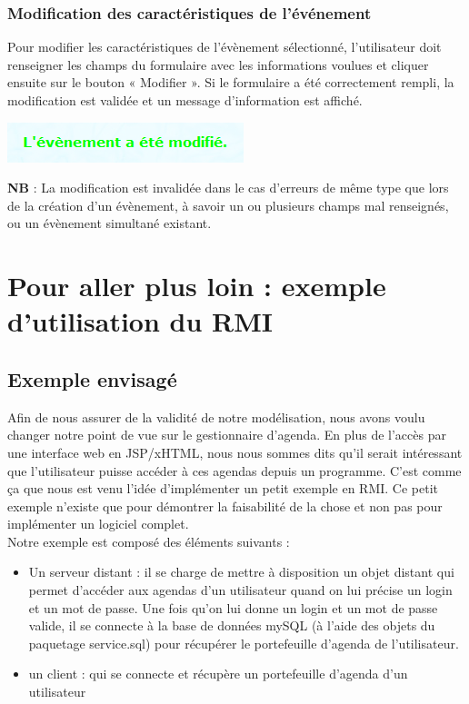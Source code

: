 \documentclass[12pt , a4paper]{article}
\begin{document}
\subsubsection{Modification des caractéristiques de l'événement}
\noindent Pour modifier les caractéristiques de l’évènement sélectionné, l’utilisateur doit renseigner les
champs du formulaire avec les informations voulues et cliquer ensuite sur le bouton
« Modifier ». Si le formulaire a été correctement rempli, la modification est validée et un
message d’information est affiché.
\begin{center}
  \includegraphics[scale=0.6]{./images/modif_event2.png}
\end{center}


\noindent \textbf{NB} : La modification est invalidée dans le cas d’erreurs de même type que lors de la création
d’un évènement, à savoir un ou plusieurs champs mal renseignés, ou un évènement simultané
existant.




\newpage
\section{Pour aller plus loin : exemple d'utilisation du RMI}
\subsection{Exemple envisagé}
\noindent Afin de nous assurer de  la validité de notre modélisation, nous avons voulu changer notre  point de vue sur le gestionnaire d'agenda. En plus de l'accès  par une interface web en JSP/xHTML,
nous nous sommes dits  qu'il serait intéressant que l'utilisateur puisse accéder à  ces agendas depuis un programme. C'est comme ça  que nous est venu l'idée d'implémenter un  petit exemple en RMI. Ce
petit exemple n'existe que pour démontrer la faisabilité de la chose et non pas pour implémenter un logiciel complet.\\
Notre exemple est composé des éléments suivants :
\begin{itemize}
\item Un serveur distant : il se charge de mettre à disposition un objet distant qui permet d'accéder aux agendas d'un utilisateur quand on lui précise un login et un mot de passe. Une fois qu'on lui
  donne un login et un mot de passe valide, il se connecte à la base de données mySQL (à l'aide des objets du paquetage service.sql) pour récupérer le portefeuille d'agenda de l'utilisateur.
\item un client : qui se connecte et récupère un portefeuille d'agenda d'un utilisateur
\end{itemize}
\end{document}

